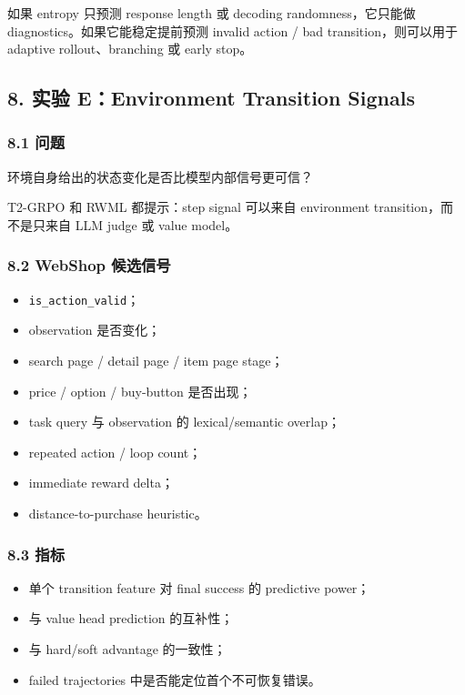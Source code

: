 \documentclass[
  10pt,
]{ctexart}
\providecommand{\tightlist}{%
  \setlength{\itemsep}{0pt}\setlength{\parskip}{0pt}}
\begin{document}
如果 entropy 只预测 response length 或 decoding randomness，它只能做
diagnostics。如果它能稳定提前预测 invalid action / bad
transition，则可以用于 adaptive rollout、branching 或 early stop。

\subsection{8. 实验 E：Environment Transition
Signals}\label{ux5b9eux9a8c-eenvironment-transition-signals}

\subsubsection{8.1 问题}\label{ux95eeux9898-5}

环境自身给出的状态变化是否比模型内部信号更可信？

T2-GRPO 和 RWML 都提示：step signal 可以来自 environment
transition，而不是只来自 LLM judge 或 value model。

\subsubsection{8.2 WebShop
候选信号}\label{webshop-ux5019ux9009ux4fe1ux53f7}

\begin{itemize}
\tightlist
\item
  \texttt{is\_action\_valid}；
\item
  observation 是否变化；
\item
  search page / detail page / item page stage；
\item
  price / option / buy-button 是否出现；
\item
  task query 与 observation 的 lexical/semantic overlap；
\item
  repeated action / loop count；
\item
  immediate reward delta；
\item
  distance-to-purchase heuristic。
\end{itemize}

\subsubsection{8.3 指标}\label{ux6307ux6807-3}

\begin{itemize}
\tightlist
\item
  单个 transition feature 对 final success 的 predictive power；
\item
  与 value head prediction 的互补性；
\item
  与 hard/soft advantage 的一致性；
\item
  failed trajectories 中是否能定位首个不可恢复错误。
\end{itemize}
\end{document}
